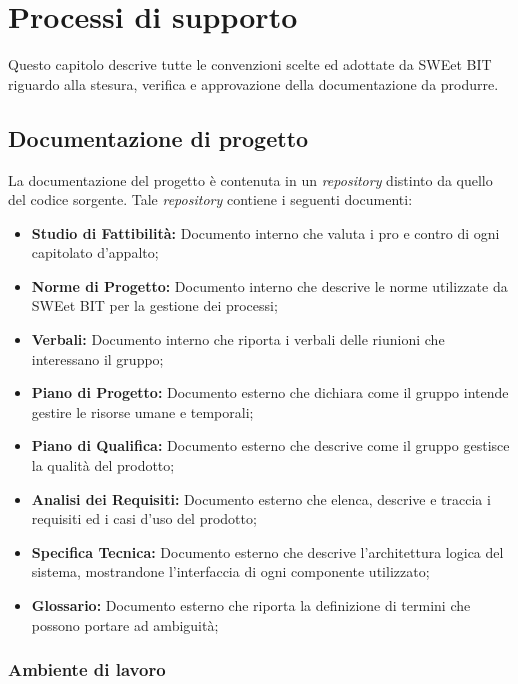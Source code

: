 \section{Processi di supporto}
Questo capitolo descrive tutte le convenzioni scelte ed adottate da SWEet BIT riguardo alla stesura, verifica e approvazione della documentazione da produrre.

\subsection{Documentazione di progetto}
La documentazione del progetto è contenuta in un \emph{repository} distinto da quello del codice sorgente. Tale \emph{repository} contiene i seguenti documenti:
\begin{itemize}
\item \textbf{Studio di Fattibilità: } Documento interno che valuta i pro e contro di ogni capitolato d'appalto;
\item \textbf{Norme di Progetto: } Documento interno che descrive le norme utilizzate da SWEet BIT per la gestione dei processi;
\item \textbf{Verbali: } Documento interno che riporta i verbali delle riunioni che interessano il gruppo;
\item \textbf{Piano di Progetto: } Documento esterno che dichiara come il gruppo intende gestire le risorse umane e temporali;
\item \textbf{Piano di Qualifica: } Documento esterno che descrive come il gruppo gestisce la qualità del prodotto;
\item \textbf{Analisi dei Requisiti: } Documento esterno che elenca, descrive e traccia i requisiti ed i casi d'uso del prodotto;
\item \textbf{Specifica Tecnica: } Documento esterno che descrive l'architettura logica del sistema, mostrandone l'interfaccia di ogni componente utilizzato;
\item \textbf{Glossario: } Documento esterno che riporta la definizione di termini che possono portare ad ambiguità;
\end{itemize} 

\subsubsection{Ambiente di lavoro}
